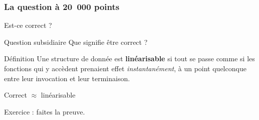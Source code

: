 \documentclass[xcolor={x11names,svgnames},x11names,svgnames]{beamer}
\begin{document}

\begin{frame}[label=lf_intset]
  \frametitle{La question à 20\ 000 points}

  {\Huge Est-ce correct ?}

  \bigskip\pause

  \begin{alertblock}{Question subsidiaire}
    Que signifie \og être correct\fg{} ?
  \end{alertblock}

  \bigskip\pause
  
  \begin{exampleblock}{Définition}
    Une structure de donnée est \textbf{linéarisable} si tout se passe comme si les
    fonctions qui y accèdent prenaient effet \emph{instantanément}, à un point
    quelconque entre leur invocation et leur terminaison.
  \end{exampleblock}

  \bigskip\pause

  Correct $\approx$ linéarisable

  \bigskip\pause

  Exercice : faites la preuve.
\end{frame}


\end{document}
